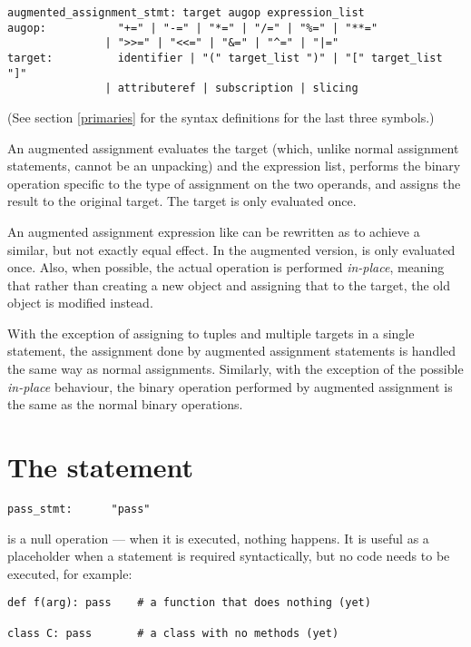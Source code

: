\begin{verbatim}
augmented_assignment_stmt: target augop expression_list
augop:           "+=" | "-=" | "*=" | "/=" | "%=" | "**="
               | ">>=" | "<<=" | "&=" | "^=" | "|="
target:          identifier | "(" target_list ")" | "[" target_list "]"
               | attributeref | subscription | slicing
\end{verbatim}

(See section \ref{primaries} for the syntax definitions for the last
three symbols.)

An augmented assignment evaluates the target (which, unlike normal
assignment statements, cannot be an unpacking) and the expression
list, performs the binary operation specific to the type of assignment
on the two operands, and assigns the result to the original
target.  The target is only evaluated once.

An augmented assignment expression like  can be rewritten as
 to achieve a similar, but not exactly equal effect. In the
augmented version,  is only evaluated once. Also, when possible, the
actual operation is performed \emph{in-place}, meaning that rather than
creating a new object and assigning that to the target, the old object is
modified instead.

With the exception of assigning to tuples and multiple targets in a single
statement, the assignment done by augmented assignment statements is handled
the same way as normal assignments. Similarly, with the exception of the
possible \emph{in-place} behaviour, the binary operation performed by
augmented assignment is the same as the normal binary operations.


\section{The  statement \label{pass}}

\begin{verbatim}
pass_stmt:      "pass"
\end{verbatim}

 is a null operation --- when it is executed, nothing
happens.  It is useful as a placeholder when a statement is
required syntactically, but no code needs to be executed, for example:

\begin{verbatim}
def f(arg): pass    # a function that does nothing (yet)

class C: pass       # a class with no methods (yet)
\end{verbatim}

